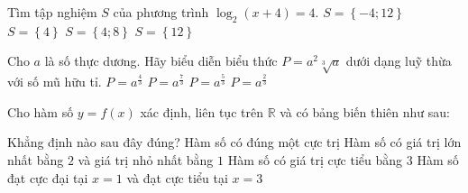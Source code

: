 \begin{ex}%
Tìm tập nghiệm $S$ của phương trình $\log _2\left( {x+4} \right)=4$.
\choice
{$S=\left\{ {-4;12} \right\}$}
{$S=\left\{ {4} \right\}$}
{$S=\left\{ {4;8} \right\}$}
{\True $S=\left\{ {12} \right\}$}
\end{ex}

\begin{ex}%
Cho $a$ là số thực dương. Hãy biểu diễn biểu thức $P=a^2\sqrt[3]{a}$ dưới dạng luỹ thừa với số mũ hữu tỉ.
\choice
{$P=a^{\frac{4}{3}}$}
{\True $P=a^{\frac{7}{3}}$}
{$P=a^{\frac{5}{3}}$}
{$P=a^{\frac{2}{3}}$}
\end{ex}

\begin{ex}%
Cho hàm số $y=f\left( {x} \right)$ xác định, liên tục trên $\mathbb{R}$ và có bảng biến thiên như sau:
\begin{center}
\end{center}
Khẳng định nào sau đây đúng?
\choice
{Hàm số có đúng một cực trị}
{Hàm số có giá trị lớn nhất bằng $2$ và giá trị nhỏ nhất bằng $1$}
{Hàm số có giá trị cực tiểu bằng $3$}
{\True Hàm số đạt cực đại tại $x=1$ và đạt cực tiểu tại $x=3$}
\end{ex}

